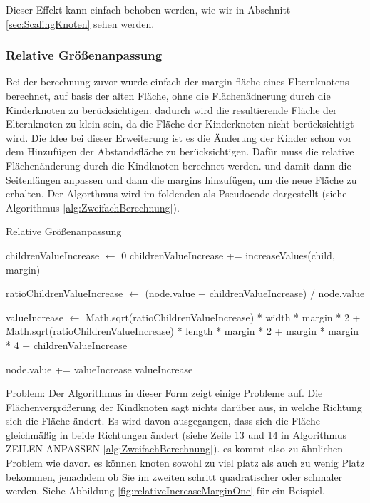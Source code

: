 Dieser Effekt kann einfach behoben werden, wie wir in Abschnitt \ref{sec:ScalingKnoten} sehen werden.

\subsubsection{Relative Größenanpassung}
Bei der berechnung zuvor wurde einfach der margin fläche eines Elternknotens berechnet, auf basis der alten Fläche, ohne die Flächenädnerung durch die Kinderknoten zu berücksichtigen. dadurch wird die resultierende Fläche der Elternknoten zu klein sein, da die Fläche der Kinderknoten nicht berücksichtigt wird.
Die Idee bei dieser Erweiterung ist es die Änderung der Kinder schon vor dem Hinzufügen der Abstandsfläche zu berücksichtigen. Dafür muss die relative Flächenänderung durch die Kindknoten berechnet werden. und damit dann die Seitenlängen anpassen und dann die margins hinzufügen, um die neue Fläche zu erhalten.
Der Algorthmus wird im foldenden als Pseudocode dargestellt (siehe Algorithmus \ref{alg:ZweifachBerechnung}). 

\begin{algorithm}[H]
\caption{Relative Größenanpassung}
\label{alg:ZweifachBerechnung}
\begin{algorithmic}[1]
    \State childrenValueIncrease $\gets$ 0
            \State childrenValueIncrease += increaseValues(child, margin)
        \EndFor
    \EndIf

    \State ratioChildrenValueIncrease $\gets$ (node.value + childrenValueIncrease) / node.value

    \State valueIncrease $\gets$ 
        Math.sqrt(ratioChildrenValueIncrease) * width * margin * 2 +
        Math.sqrt(ratioChildrenValueIncrease) * length * margin * 2 +
        margin * margin * 4 +
        childrenValueIncrease

    \State node.value += valueIncrease
    \State \Return valueIncrease
\EndFunction
\end{algorithmic}
\end{algorithm}

Problem:
Der Algorithmus in dieser Form zeigt einige Probleme auf. Die Flächenvergrößerung der Kindknoten sagt nichts darüber aus, in welche Richtung sich die Fläche ändert. Es wird davon ausgegangen, dass sich die Fläche gleichmäßig in beide Richtungen ändert (siehe Zeile 13 und 14 in Algorithmus ZEILEN ANPASSEN  \ref{alg:ZweifachBerechnung}). 
es kommt also zu ähnlichen Problem wie davor. es können knoten sowohl zu viel platz als auch zu wenig Platz bekommen, jenachdem ob Sie im zweiten schritt quadratischer oder schmaler werden.  Siehe Abbildung \ref{fig:relativeIncreaseMarginOne} für ein Beispiel.

